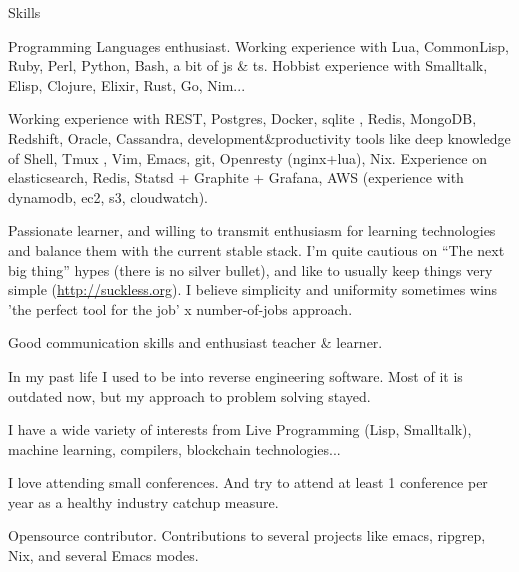 \documentclass{resume} %
\begin{document}
\begin{rSection}{Skills}

\item Programming Languages enthusiast. Working experience with Lua,
  CommonLisp, Ruby, Perl, Python, Bash, a bit of js \& ts. Hobbist
  experience with Smalltalk, Elisp, Clojure, Elixir, Rust, Go, Nim...

\item Working experience with REST, Postgres, Docker, sqlite , Redis,
  MongoDB, Redshift, Oracle, Cassandra, development\&productivity
  tools like deep knowledge of Shell, Tmux , Vim, Emacs, git,
  Openresty (nginx+lua), Nix. Experience on elasticsearch, Redis,
  Statsd + Graphite + Grafana, AWS (experience with dynamodb, ec2, s3,
  cloudwatch).

\item Passionate learner, and willing to transmit enthusiasm for
  learning technologies and balance them with the current stable
  stack. I'm quite cautious on ``The next big thing'' hypes (there is
  no silver bullet), and like to usually keep things very simple
  (\url{http://suckless.org}). I believe simplicity and uniformity
  sometimes wins 'the perfect tool for the job' x number-of-jobs
  approach.

\item Good communication skills and enthusiast teacher \& learner.

\item In my past life I used to be into reverse engineering
  software. Most of it is outdated now, but my approach to problem
  solving stayed.

\item I have a wide variety of interests from Live Programming (Lisp,
  Smalltalk), machine learning, compilers, blockchain technologies...

\item I love attending small conferences. And try to attend at least 1
  conference per year as a healthy industry catchup measure.

\item Opensource contributor. Contributions to several projects like
  emacs, ripgrep, Nix, and several Emacs modes.
\end{rSection}



\end{document}
